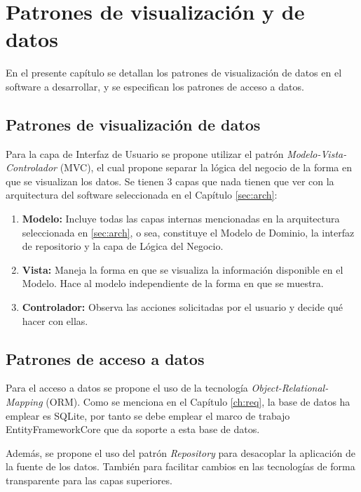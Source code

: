 \chapter{Patrones de visualización y de datos}

En el presente capítulo se detallan los patrones de visualización de datos en el software a desarrollar, y se especifican los patrones de acceso a datos.

\section{Patrones de visualización de datos}\label{sec:vis}

Para la capa de Interfaz de Usuario se propone utilizar el patrón \textit{Modelo-Vista-Controlador} (MVC), el cual propone separar la lógica del negocio de la forma en que se visualizan los datos. Se tienen 3 capas que nada tienen que ver con la arquitectura del software seleccionada en el Capítulo \ref{sec:arch}:

\begin{enumerate}
    \item \textbf{Modelo:} Incluye todas las capas internas mencionadas en la arquitectura seleccionada en \ref{sec:arch}, o sea, constituye el Modelo de Dominio, la interfaz de repositorio y la capa de Lógica del Negocio.
    \item \textbf{Vista:} Maneja la forma en que se visualiza la información disponible en el Modelo. Hace al modelo independiente de la forma en que se muestra.
    \item \textbf{Controlador:} Observa las acciones solicitadas por el usuario y decide qué hacer con ellas. 
\end{enumerate}

\section{Patrones de acceso a datos}\label{sec:data}

Para el acceso a datos se propone el uso de la tecnología \textit{Object-Relational-Mapping} (ORM). Como se menciona en el Capítulo \ref{ch:req}, la base de datos ha emplear es SQLite, por tanto se debe emplear el marco de trabajo EntityFrameworkCore que da soporte a esta base de datos.

Además, se propone el uso del patrón \textit{Repository} para desacoplar la aplicación de la fuente de los datos. También para facilitar cambios en las tecnologías de forma transparente para las capas superiores. 

